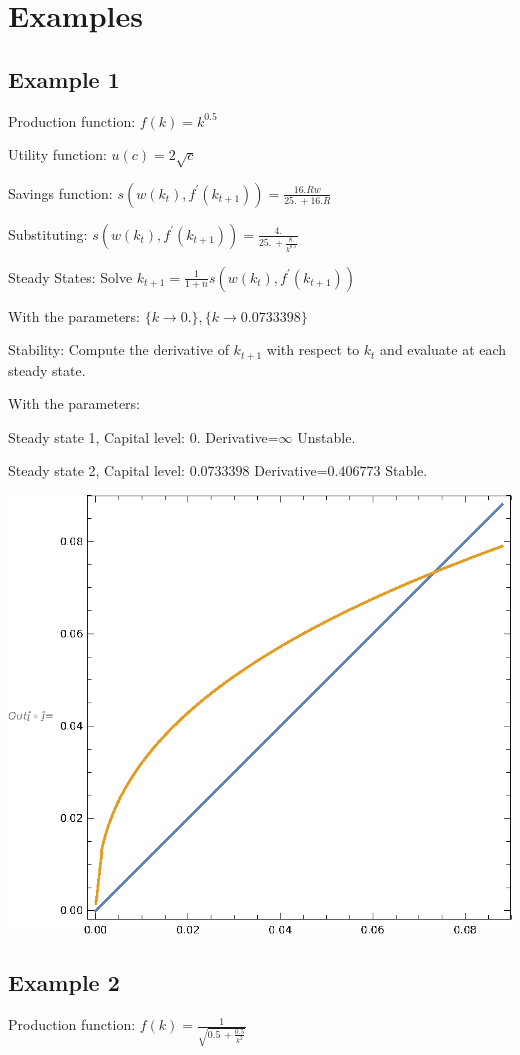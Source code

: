 \documentclass[11pt, a4paper]{article}
\begin{document}
\section*{Examples}
\subsection*{Example 1}
Production function:    $f(k)=k^{0.5}$

Utility function:       $u(c)=2 \sqrt{c}$

Savings function:       $s(w(k_t),f^\prime(k_{t+1}))=\frac{16. R w}{25.\, +16. R}$

Substituting: $s(w(k_t),f^\prime(k_{t+1}))= \frac{4.}{25.\, +\frac{8.}{k^{0.5}}}$

Steady States:          Solve $k_{t+1} = \frac{1}{1+n}s(w(k_t),f^\prime(k_{t+1}))$

With the parameters: $\{k\to 0.\},\{k\to 0.0733398\}$

Stability:             Compute the derivative of $k_{t+1}$ with respect to $k_t$ and evaluate at each steady state.

With the parameters:

\quad Steady state 1, Capital level: $0$. Derivative=$\infty$ Unstable.

\quad Steady state 2, Capital level: $0.0733398$ Derivative=$0.406773$ Stable.

\includegraphics{xamples_gr1.eps}
\subsection*{Example 2}
Production function:    $f(k)=\frac{1}{\sqrt{0.5\, +\frac{0.5}{k^2}}}$
\end{document}
